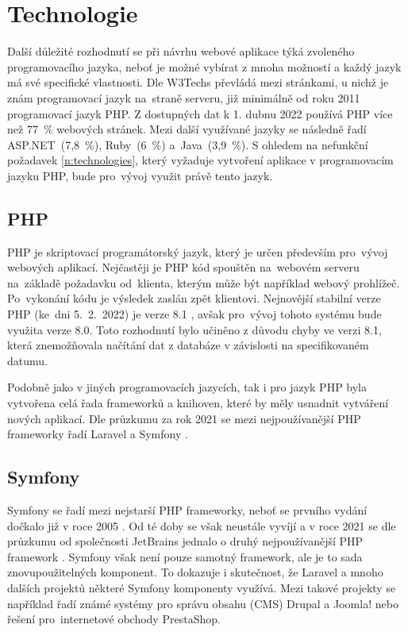 \section{Technologie}
Další důležité rozhodnutí se při návrhu webové aplikace týká zvoleného programovacího jazyka, neboť je možné vybírat z mnoha možností a každý jazyk má své specifické vlastnosti. Dle W3Techs převládá mezi stránkami, u nichž je znám programovací jazyk na~straně serveru, již minimálně od roku 2011 programovací jazyk PHP. Z dostupných dat k 1. dubnu 2022 používá PHP více než 77~\% webových stránek. Mezi další využívané jazyky se následně řadí ASP.NET~(7,8~\%), Ruby~(6~\%) a~Java~(3,9~\%). \cite{php_w3techs} S ohledem na nefunkční požadavek \ref{n:technologies}, který vyžaduje vytvoření aplikace v programovacím jazyku PHP, bude pro~vývoj využit právě tento jazyk.

\subsection{PHP}
 PHP je skriptovací programátorský jazyk, který je určen především pro~vývoj webových aplikací. Nejčastěji je PHP kód spouštěn na~webovém serveru na~základě požadavku od~klienta, kterým může být například webový prohlížeč. Po~vykonání kódu je výsledek zaslán zpět klientovi. \cite{php_intro_1, php_intro_2} Nejnovější stabilní verze PHP (ke~dni 5.~2.~2022) je verze 8.1 \cite{php_version}, avšak pro~vývoj tohoto systému bude využita verze 8.0. Toto rozhodnutí bylo učiněno z důvodu chyby ve verzi 8.1, která znemožňovala načítání dat z databáze v závislosti na specifikovaném datumu.
 
 Podobně jako v jiných programovacích jazycích, tak i pro jazyk PHP byla vytvořena celá řada frameworků a knihoven, které by měly usnadnit vytváření nových aplikací. Dle průzkumu za rok 2021 se mezi nejpoužívanější PHP frameworky řadí Laravel a Symfony \cite{php_jetbrains}.
 
\subsection{Symfony}
Symfony se řadí mezi nejstarší PHP frameworky, neboť se prvního vydání dočkalo již v roce 2005 \cite{symfony_legacy}. Od té doby se však neustále vyvíjí a v roce 2021 se dle průzkumu od společnosti \mbox{JetBrains} jednalo o druhý nejpoužívanější PHP framework \cite{php_jetbrains}. Symfony však není pouze samotný framework, ale je to sada znovupoužitelných komponent. To dokazuje i skutečnost, že Laravel a mnoho dalších projektů některé Symfony komponenty využívá. Mezi takové projekty se například řadí známé systémy pro správu obsahu (CMS) Drupal a Joomla! nebo řešení pro~internetové obchody PrestaShop. \cite{symfony_projects}

